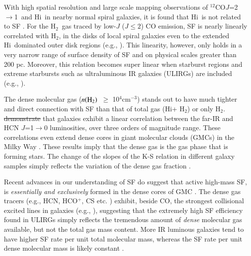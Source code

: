 \documentclass[legal,11pt]{article}
\def\cmt   {cm$^{-3}$\,}
\def\,{\thinspace}
\def\HI{H{\sc i}}
\def\Htwo{H$_2$}
\def\nHtwo{$n({\rm H}_2)$}
\def\Htwo       {H$_2$}
\def\COto      {$^{12}$CO$J$=2$\rightarrow$1}
\providecommand{\DIFaddtex}[1]{{\protect\color{blue}\uwave{#1}}} %
\providecommand{\DIFdeltex}[1]{{\protect\color{red}\sout{#1}}}                      %
\providecommand{\DIFaddbegin}{} %
\providecommand{\DIFaddend}{} %
\providecommand{\DIFdelbegin}{} %
\providecommand{\DIFdelend}{} %
\providecommand{\DIFadd}[1]{\texorpdfstring{\DIFaddtex{#1}}{#1}} %
\providecommand{\DIFdel}[1]{\texorpdfstring{\DIFdeltex{#1}}{}} %
\begin{document}
With high spatial resolution and large scale mapping observations of \COto\ and
\HI\ in nearby normal spiral galaxies, it is found that \HI\ is not related to
SF \citep[e.g.,][]{Bigiel2008}. For the \Htwo\ gas traced by low-$J$ ($J\le2$)
CO emission, SF is nearly linearly correlated with \Htwo, in the disks of local
spiral galaxies even to the extended \HI\ dominated outer disk
regions (e.g., \citealt{Bigiel2008,Schruba2011,Leroy2013}). This linearity,
however, only holds in a very narrow range of surface density of SF and on
physical scales greater than 200 pc.  Moreover, this relation becomes super
linear when starburst regions and extreme starbursts such as ultraluminous
IR galaxies (ULIRGs) are included (e.g.,
\citealt{Genzel2010,Daddi2010a}).  


The dense molecular gas (\nHtwo\ $\ge$ 10$^4$\cmt) stands out to have much
tighter and direct connection with SF than that of total gas (\HI + \Htwo) or
only \Htwo. \citet[][Fig. 2]{gs04a,gs04b} \DIFdelbegin \DIFdel{demonstrate }\DIFdelend \DIFaddbegin \DIFadd{have shown }\DIFaddend that galaxies exhibit a
linear correlation between the far-IR and HCN $J$=1$\rightarrow$0 luminosities,
over three orders of magnitude range. These correlations even extend dense
cores in giant molecular clouds (GMCs) in the Milky Way \citep{weg05,zgh2014}.
These results imply that the dense gas is the gas phase that is forming
stars. The change of the slopes of the K-S relation in different galaxy samples
simply reflects the variation of the dense gas fraction \citep[e.g.,][]{Lada2010b}. 

Recent advances in our understanding of SF do suggest that active high-mass SF,
is {\it essentially and exclusively} formed in the dense cores of GMC
\citep[e.g.,][]{Evans08}. The dense gas tracers (e.g., HCN, HCO$^+$, CS etc. )
exhibit, beside CO, the strongest collisional excited lines in galaxies (e.g.,
\citealt{rwc06,gc08,Baan08,Greve14}), suggesting that the extremely high SF
efficiency found in ULIRGs simply reflects the tremendous amount of {\it dense}
molecular gas available, but not the total gas mass
content\citep[e.g.,][]{Lada2010b}.  More IR luminous galaxies tend to have
higher SF rate per unit total molecular mass, whereas the SF rate per unit
dense molecular mass is likely constant \citep[][]{gs04a,gs04b}.
\end{document}
